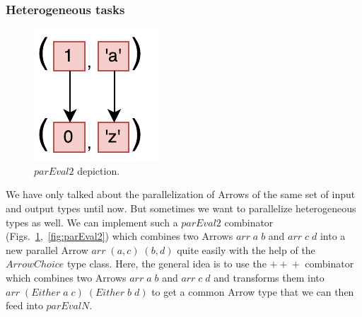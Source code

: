 \documentclass{jfp1}
\newcommand{\Conid}[1]{\mathit{#1}}
\newcommand{\Varid}[1]{\mathit{#1}}
\begin{document}
\subsubsection{Heterogeneous tasks}
\begin{figure}[tb]
	\includegraphics[scale=0.7]{images/parEval2}
	\caption{\ensuremath{\Varid{parEval2}} depiction.}
	\label{fig:parEval2Img}
\end{figure}
We have only talked about the parallelization of Arrows of the same set of input and output types until now. But sometimes we want to parallelize heterogeneous types as well. We can implement such a \ensuremath{\Varid{parEval2}} combinator (Figs.~\ref{fig:parEval2Img},~\ref{fig:parEval2}) which combines two Arrows \ensuremath{\Varid{arr}\;\Varid{a}\;\Varid{b}} and \ensuremath{\Varid{arr}\;\Varid{c}\;\Varid{d}} into a new parallel Arrow \ensuremath{\Varid{arr}\;(\Varid{a},\Varid{c})\;(\Varid{b},\Varid{d})} quite easily with the help of the \ensuremath{\Conid{ArrowChoice}} type class. Here, the general idea is to use the \ensuremath{\mathbin{+\!\!+\!\!+}} combinator which combines two Arrows \ensuremath{\Varid{arr}\;\Varid{a}\;\Varid{b}} and \ensuremath{\Varid{arr}\;\Varid{c}\;\Varid{d}} and transforms them into \ensuremath{\Varid{arr}\;(\Conid{Either}\;\Varid{a}\;\Varid{c})\;(\Conid{Either}\;\Varid{b}\;\Varid{d})} to get a common Arrow type that we can then feed into \ensuremath{\Varid{parEvalN}}.

\end{document}
